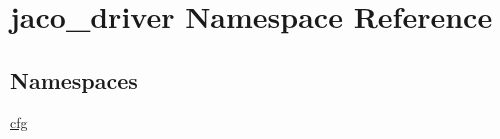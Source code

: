 \hypertarget{namespacejaco__driver}{}\section{jaco\+\_\+driver Namespace Reference}
\label{namespacejaco__driver}
\subsection*{Namespaces}
\begin{DoxyCompactItemize}
\item 
 \hyperlink{namespacejaco__driver_1_1cfg}{cfg}
\end{DoxyCompactItemize}
